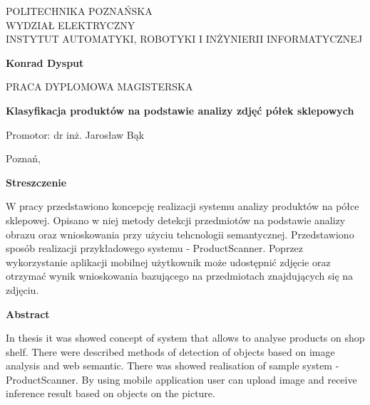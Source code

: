 \documentclass[12pt,a4paper,leqno,oneside,titlepage]{mwrep}
\begin{document}
\begin{titlepage}
\begin{center}
{\large POLITECHNIKA POZNAŃSKA\\ WYDZIAŁ ELEKTRYCZNY\\ INSTYTUT AUTOMATYKI, ROBOTYKI I INŻYNIERII INFORMATYCZNEJ\par}
\end{center}
\vspace{1.5cm plus 1fill}
\begin{center}
{\bf \Large Konrad Dysput\par}
\end{center}
\vspace{1.5cm plus 1mm minus 2mm}
\begin{center}
{\large PRACA DYPLOMOWA MAGISTERSKA\par}
\end{center}
\vspace{1.5cm plus 1mm minus 2mm}
\begin{center}
{\huge\textbf{Klasyfikacja produktów na podstawie analizy zdjęć półek sklepowych }\par}
\vspace{1.5cm plus 1.5fill}
\begin{flushright}
{\large Promotor: dr inż. Jarosław Bąk}
\end{flushright}
\vspace{4cm plus .1fill}
{\large Poznań,\par}
\end{center}
\end{titlepage}
\newpage
\begin{center}
{\large\textbf{Streszczenie}}
\end{center}
	W pracy przedstawiono koncepcję realizacji systemu analizy produktów na półce sklepowej. Opisano w niej metody detekcji przedmiotów na podstawie analizy obrazu oraz wnioskowania przy użyciu tehcnologii semantycznej. Przedstawiono sposób realizacji przykładowego systemu - ProductScanner. Poprzez wykorzystanie aplikacji mobilnej użytkownik może udostępnić zdjęcie oraz otrzymać wynik wnioskowania bazującego na przedmiotach znajdujących się na zdjęciu.
	\newline
\begin{center}
	{\large\textbf{Abstract}}
\end{center}
	In thesis it was showed concept of system that allows to analyse products on shop shelf. There were described methods of detection of objects based on image analysis and web semantic. There was showed realisation of sample system - ProductScanner. By using mobile application user can upload image and receive inference result based on objects on the picture.
\end{document}
